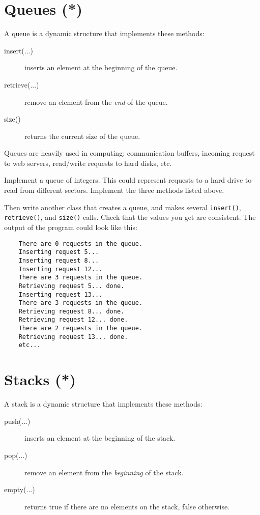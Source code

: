 \documentclass{article}
\begin{document}
\section{Queues (*)}
\label{sec:queues}

A queue is a dynamic structure that implements these methods: 

\begin{description}
\item[insert(...)] inserts an element at the beginning of the queue.
\item[retrieve(...) ] remove an element from the \emph{end} of the queue.
\item[size() ] returns the current size of the queue. 
\end{description}

Queues are heavily used in computing: communication
buffers, incoming request to web servers, read/write requests to hard
disks, etc. 

Implement a queue of integers. This could represent requests
to a hard drive to read from different sectors. Implement the three
methods listed above. 

Then write another class that creates a queue, and makes several
\verb+insert()+, \verb+retrieve()+, and \verb+size()+ calls. Check
that the values you get are consistent. The output of the program
could look like this: 

\begin{verbatim}
    There are 0 requests in the queue.
    Inserting request 5...
    Inserting request 8...
    Inserting request 12...
    There are 3 requests in the queue.
    Retrieving request 5... done. 
    Inserting request 13...
    There are 3 requests in the queue.
    Retrieving request 8... done. 
    Retrieving request 12... done. 
    There are 2 requests in the queue.
    Retrieving request 13... done. 
    etc...
\end{verbatim}

\section{Stacks (*)}
\label{sec:stack}

A stack is a dynamic structure that implements these methods: 

\begin{description}
\item[push(...)] inserts an element at the beginning of the stack.
\item[pop(...) ] remove an element from the \emph{beginning} of the stack.
\item[empty(...) ] returns true if there are no elements on the stack,
  false otherwise.
\end{description}
\end{document}
